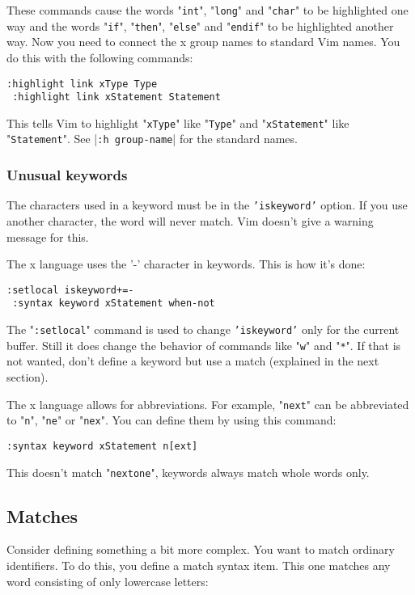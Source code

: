 These commands cause the words "\texttt{int}", "\texttt{long}" and "\texttt{char}" to be highlighted one way and the words "\texttt{if}", "\texttt{then}", "\texttt{else}" and "\texttt{endif}" to be highlighted another way.
Now you need to connect the x group names to standard Vim names.
You do this with the following commands:

\begin{Verbatim}[samepage=true]
 :highlight link xType Type
 :highlight link xStatement Statement
\end{Verbatim}

This tells Vim to highlight "\texttt{xType}" like "\texttt{Type}" and "\texttt{xStatement}" like "\texttt{Statement}".
See |\texttt{:h group-name}| for the standard names.

\subsubsection{Unusual keywords}
The characters used in a keyword must be in the \texttt{'iskeyword'} option.
If you use another character, the word will never match.
Vim doesn't give a warning message for this.

The x language uses the '-' character in keywords.
This is how it's done:

\begin{Verbatim}[samepage=true]
 :setlocal iskeyword+=-
 :syntax keyword xStatement when-not
\end{Verbatim}

The "\texttt{:setlocal}" command is used to change \texttt{'iskeyword'} only for the current buffer.
Still it does change the behavior of commands like "\texttt{w}" and "\texttt{*}".
If that is not wanted, don't define a keyword but use a match (explained in the next section).

The x language allows for abbreviations.
For example, "\texttt{next}" can be abbreviated to "\texttt{n}", "\texttt{ne}" or "\texttt{nex}".
You can define them by using this command:

\begin{Verbatim}[samepage=true]
 :syntax keyword xStatement n[ext]
\end{Verbatim}

This doesn't match "\texttt{nextone}", keywords always match whole words only.
\subsection{Matches}
Consider defining something a bit more complex.
You want to match ordinary identifiers.
To do this, you define a match syntax item.
This one matches any word consisting of only lowercase letters:


